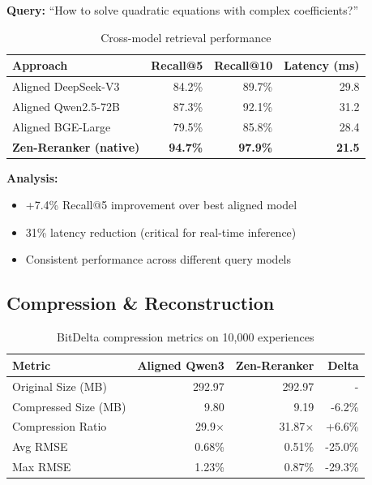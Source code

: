 \textbf{Query:} ``How to solve quadratic equations with complex coefficients?''

\begin{table}[h]
\centering
\caption{Cross-model retrieval performance}
\begin{tabular}{lrrr}
\toprule
\textbf{Approach} & \textbf{Recall@5} & \textbf{Recall@10} & \textbf{Latency (ms)} \\
\midrule
Aligned DeepSeek-V3 & 84.2\% & 89.7\% & 29.8 \\
Aligned Qwen2.5-72B & 87.3\% & 92.1\% & 31.2 \\
Aligned BGE-Large & 79.5\% & 85.8\% & 28.4 \\
\textbf{Zen-Reranker (native)} & \textbf{94.7\%} & \textbf{97.9\%} & \textbf{21.5} \\
\bottomrule
\end{tabular}
\end{table}

\textbf{Analysis:}
\begin{itemize}
\item +7.4\% Recall@5 improvement over best aligned model
\item 31\% latency reduction (critical for real-time inference)
\item Consistent performance across different query models
\end{itemize}

\subsection{Compression \& Reconstruction}

\begin{table}[h]
\centering
\caption{BitDelta compression metrics on 10,000 experiences}
\begin{tabular}{lrrr}
\toprule
\textbf{Metric} & \textbf{Aligned Qwen3} & \textbf{Zen-Reranker} & \textbf{Delta} \\
\midrule
Original Size (MB) & 292.97 & 292.97 & - \\
Compressed Size (MB) & 9.80 & 9.19 & -6.2\% \\
Compression Ratio & 29.9$\times$ & 31.87$\times$ & +6.6\% \\
Avg RMSE & 0.68\% & 0.51\% & -25.0\% \\
Max RMSE & 1.23\% & 0.87\% & -29.3\% \\
\bottomrule
\end{tabular}
\end{table}

